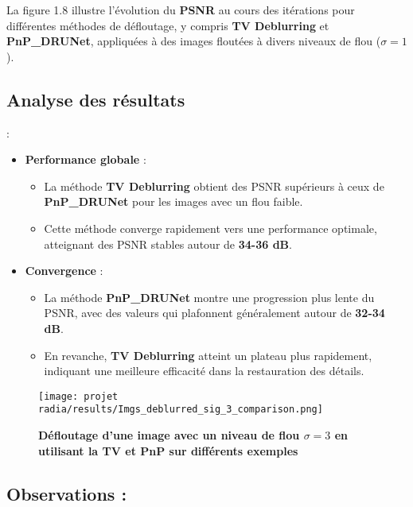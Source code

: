 \documentclass[a4paper, 12pt]{report} %
\begin{document}
La figure 1.8 illustre l'évolution du \textbf{PSNR} au cours des itérations pour différentes méthodes de défloutage, y compris \textbf{TV Deblurring} et \textbf{PnP\_DRUNet}, appliquées à des images floutées à divers niveaux de flou ($\sigma = 1$).

\subsection*{Analyse des résultats} :

\begin{itemize}
    \item \textbf{Performance globale} :
    \begin{itemize}
        \item La méthode \textbf{TV Deblurring} obtient des PSNR  supérieurs à ceux de \textbf{PnP\_DRUNet}  pour les images avec un flou faible.
        \item Cette méthode converge rapidement vers une performance optimale, atteignant des PSNR stables autour de \textbf{34-36 dB}.
    \end{itemize}
    \item \textbf{Convergence} :
    \begin{itemize}
        \item La méthode \textbf{PnP\_DRUNet} montre une progression plus lente du PSNR, avec des valeurs qui plafonnent généralement autour de \textbf{32-34 dB}.
        \item En revanche, \textbf{TV Deblurring} atteint un plateau plus rapidement, indiquant une meilleure efficacité dans la restauration des détails.
    \end{itemize}
\end{itemize}

\begin{figure}[H]
    \centering
    \texttt{[image: projet radia/results/Imgs\_deblurred\_sig\_3\_comparison.png]}
    \caption{ \textbf{Défloutage d'une image avec un niveau de flou $\sigma = 3$ en utilisant la TV et PnP  sur différents exemples}
 }
    \label{fig:9}
\end{figure} 
\subsection*{Observations :}
\end{document}
